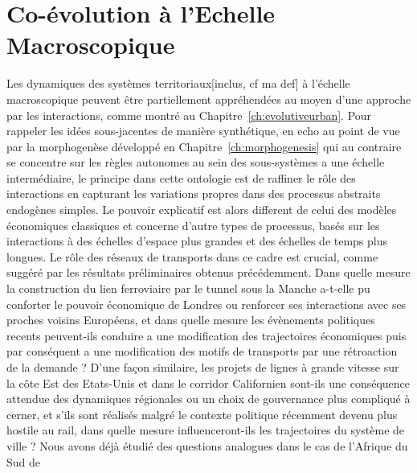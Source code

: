 
\chapter{Co-évolution à l'Echelle Macroscopique}


\label{ch:macrocoevolution} 




Les dynamiques des systèmes territoriaux[inclus, cf ma def] à l'échelle macroscopique peuvent être partiellement appréhendées au moyen d'une approche par les interactions, comme montré au Chapitre~\ref{ch:evolutiveurban}. Pour rappeler les idées sous-jacentes de manière synthétique, en echo au point de vue par la morphogenèse développé en Chapitre~\ref{ch:morphogenesis} qui au contraire se concentre sur les règles autonomes au sein des sous-systèmes a une échelle intermédiaire, le principe dans cette ontologie est de raffiner le rôle des interactions en capturant les variations propres dans des processus abstraits endogènes simples. Le pouvoir explicatif est alors different de celui des modèles économiques classiques et concerne d'autre types de processus, basés sur les interactions à des échelles d'espace plus grandes et des échelles de temps plus longues. Le rôle des réseaux de transports dans ce cadre est crucial, comme suggéré par les résultats préliminaires obtenus précédemment. Dans quelle mesure la construction du lien ferroviaire par le tunnel sous la Manche a-t-elle pu conforter le pouvoir économique de Londres ou renforcer ses interactions avec ses proches voisins Européens, et dans quelle mesure les évènements politiques recents peuvent-ils conduire a une modification des trajectoires économiques puis par conséquent a une modification des motifs de transports par une rétroaction de la demande ? D'une façon similaire, les projets de lignes à grande vitesse sur la côte Est des Etats-Unis et dans le corridor Californien sont-ils une conséquence attendue des dynamiques régionales ou un choix de gouvernance plus compliqué à cerner, et s'ils sont réalisés malgré le contexte politique récemment devenu plus hostile au rail, dans quelle mesure influenceront-ils les trajectoires du système de ville ? Nous avons déjà étudié des questions analogues dans le cas de l'Afrique du Sud de 